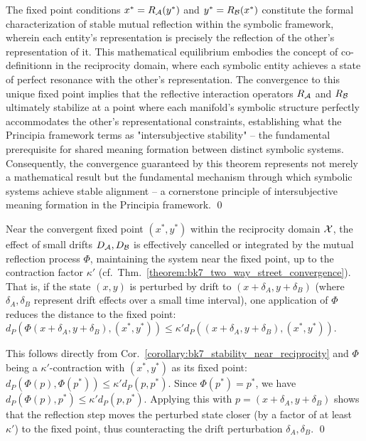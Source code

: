\begin{demonstratio}
The fixed point conditions \(x^{\ast} = R_{\mathcal{A}}(y^{\ast})\) and \(y^{\ast} = R_{\mathcal{B}}(x^{\ast})\) constitute the formal characterization of stable mutual reflection within the symbolic framework, wherein each entity's representation is precisely the reflection of the other's representation of it. This mathematical equilibrium embodies the concept of co-definitionn in the reciprocity domain, where each symbolic entity achieves a state of perfect resonance with the other's representation. The convergence to this unique fixed point implies that the reflective interaction operators \(R_{\mathcal{A}}\) and \(R_{\mathcal{B}}\) ultimately stabilize at a point where each manifold's symbolic structure perfectly accommodates the other's representational constraints, establishing what the Principia framework terms as "intersubjective stability" -- the fundamental prerequisite for shared meaning formation between distinct symbolic systems. Consequently, the convergence guaranteed by this theorem represents not merely a mathematical result but the fundamental mechanism through which symbolic systems achieve stable alignment -- a cornerstone principle of intersubjective meaning formation in the Principia framework. \qed \end{demonstratio}
\begin{corollary}
\label{corollary:bk7_stability_near_reciprocity}
Near the convergent fixed point \((x^{\ast}, y^{\ast})\) within the reciprocity domain \(\mathcal{X}\), the effect of small drifts \(D_{\mathcal{A}}, D_{\mathcal{B}}\) is effectively cancelled or integrated by the mutual reflection process \(\Phi\), maintaining the system near the fixed point, up to the contraction factor \(\kappa'\) (cf.~Thm.~\ref{theorem:bk7_two_way_street_convergence}). That is, if the state \((x,y)\) is perturbed by drift to \((x+\delta_A, y+\delta_B)\) (where \(\delta_A, \delta_B\) represent drift effects over a small time interval), one application of \(\Phi\) reduces the distance to the fixed point: \(d_P(\Phi(x+\delta_A, y+\delta_B), (x^{\ast}, y^{\ast})) \le \kappa' d_P((x+\delta_A, y+\delta_B), (x^{\ast}, y^{\ast}))\).
\end{corollary}
\begin{demonstratio}
\label{demonstratio:bk7_perturbation_contraction_recovery}
This follows directly from Cor.~\ref{corollary:bk7_stability_near_reciprocity} and \(\Phi\) being a \(\kappa'\)-contraction with \((x^{\ast}, y^{\ast})\) as its fixed point: \(d_P(\Phi(p), \Phi(p^*)) \le \kappa' d_P(p, p^*)\). Since \(\Phi(p^*) = p^*\), we have \(d_P(\Phi(p), p^*) \le \kappa' d_P(p, p^*)\). Applying this with \(p = (x+\delta_A, y+\delta_B)\) shows that the reflection step moves the perturbed state closer (by a factor of at least \(\kappa'\)) to the fixed point, thus counteracting the drift perturbation \(\delta_A, \delta_B\). \qed
\end{demonstratio}

